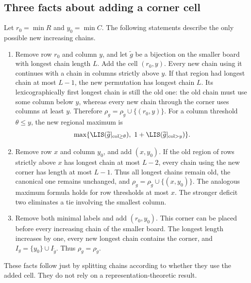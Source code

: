 \subsection{Three facts about adding a corner cell}
Let $r_0=\min R$ and $y_0=\min C$. The following statements describe the only possible new increasing chains.
\begin{enumerate}
\item Remove row $r_0$ and column $y$, and let $\widetilde g$ be a bijection on the smaller board with longest chain length $L$. Add the cell $(r_0,y)$. Every new chain using it continues with a chain in columns strictly above $y$. If that region had longest chain at most $L-1$, the new permutation has longest chain $L$. Its lexicographically first longest chain is still the old one: the old chain must use some column below $y$, whereas every new chain through the corner uses columns at least $y$. Therefore $\rho_g=\rho_{\widetilde g}\cup\{(r_0,y)\}$. For a column threshold $\theta\le y$, the new regional maximum is
\[\max\{\LIS(\widetilde g|_{\mathrm{col}\ge\theta}),\ 1+\LIS(\widetilde g|_{\mathrm{col}>y})\}.
\]
\item Remove row $x$ and column $y_0$, and add $(x,y_0)$. If the old region of rows strictly above $x$ has longest chain at most $L-2$, every chain using the new corner has length at most $L-1$. Thus all longest chains remain old, the canonical one remains unchanged, and $\rho_g=\rho_{\widetilde g}\cup\{(x,y_0)\}$. The analogous maximum formula holds for row thresholds at most $x$. The stronger deficit two eliminates a tie involving the smallest column.
\item Remove both minimal labels and add $(r_0,y_0)$. This corner can be placed before every increasing chain of the smaller board. The longest length increases by one, every new longest chain contains the corner, and $I_g=\{y_0\}\cup I_{\widetilde g}$. Thus $\rho_g=\rho_{\widetilde g}$.
\end{enumerate}
These facts follow just by splitting chains according to whether they use the added cell. They do not rely on a representation-theoretic result.

